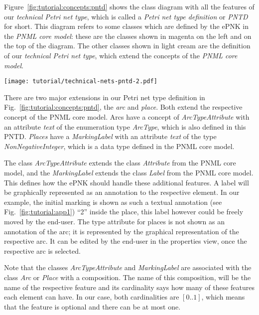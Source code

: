 Figure~\ref{fig:tutorial:concepts:pntd} shows the class diagram with all the
features of our \emph{technical Petri net type}, which is called a \emph{Petri
net type definition} or \emph{PNTD} for short. This diagram refers to some classes which
are defined by the ePNK in the \emph{PNML core model}: these are the classes
shown in magenta on the left and on the top of the diagram. The other classes
shown in light cream are the definition of our \emph{technical Petri net type},
which extend the concepts of the \emph{PNML core model}.

\begin{sidewaysfigure}[hbtp!!]
  \centerline{\texttt{[image: tutorial/technical-nets-pntd-2.pdf]}}
  \caption{The Petri net type definition for the technical Petri net type}
  \label{fig:tutorial:concepts:pntd}
\end{sidewaysfigure}

There are two major extensions in our Petri net type definition in
Fig.~\ref{fig:tutorial:concepts:pntd}, the \emph{arc} and \emph{place}. Both
extend the respective concept of the PNML core model. Arcs have a concept of
\emph{ArcTypeAttribute} with an attribute \emph{text} of the enumeration type
\emph{ArcType}, which is also defined in this PNTD. \emph{Places} have
a \emph{MarkingLabel} with an attribute \emph{text} of the type
\emph{NonNegativeInteger}, which is a data type defined in the PNML core model.

The class \emph{ArcTypeAttribute} extends the class \emph{Attribute} from the
PNML core model, and the \emph{MarkingLabel} extends the class  \emph{Label}
from the PNML core model. This defines how the ePNK should handle these
additional features. A label will be graphically represented as an annotation
to the respective element. In our example, the initial marking is shown as such
a textual annotation (see Fig.~\ref{fig:tutorial:app1}) ``2'' inside the place,
this label however could be freely moved by the end-user. The type attribute
for places is not shown as an annotation of the arc; it is represented by the
graphical representation of the respective arc. It can be edited by the end-user
in the properties view, once the respective arc is selected.

Note that the classes \emph{ArcTypeAttribute} and \emph{MarkingLabel} are
associated with the class \emph{Arc} or \emph{Place} with a composition. The
name of this composition, will be the name of the respective feature and its
cardinality says how many of these features each element can have. In our
case, both cardinalities are $[0..1]$, which means that the feature is
optional and there can be at most one.

